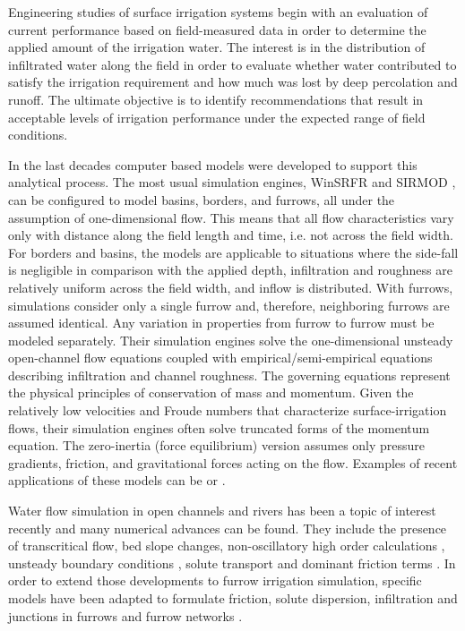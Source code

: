 \documentclass[review,authoryear]{elsarticle}
\begin{document}
Engineering studies of surface irrigation systems begin with an evaluation of
current performance based on field-measured data in order to determine the
applied amount of the irrigation water. The interest is in the distribution of
infiltrated water along the field in order to evaluate whether water contributed
to satisfy the irrigation requirement and how much was lost by deep percolation
and runoff. The ultimate objective is to identify recommendations that result in
acceptable levels of irrigation performance under the expected range of field
conditions.

In the last decades computer based models were developed to support this
analytical process. The most usual simulation engines, WinSRFR
\citep{Clemmens99} and SIRMOD \citep{Walker03}, can be configured to model
basins, borders, and furrows, all under the assumption of one-dimensional flow.
This means that all flow characteristics vary only with distance along the field
length and time, i.e. not across the field width. For borders and basins, the
models are applicable to situations where the side-fall is negligible in
comparison with the applied depth, infiltration and roughness are relatively
uniform across the field width, and inflow is distributed. With furrows,
simulations consider only a single furrow and, therefore, neighboring furrows
are assumed identical. Any variation in properties from furrow to furrow must be
modeled separately. Their simulation engines solve the one-dimensional unsteady
open-channel flow equations coupled with empirical/semi-empirical equations
describing infiltration and channel roughness. The governing equations represent
the physical principles of conservation of mass and momentum. Given the
relatively low velocities and Froude numbers that characterize
surface-irrigation flows, their simulation engines often solve truncated forms
of the momentum equation. The zero-inertia (force equilibrium) version assumes
only pressure gradients, friction, and gravitational forces acting on the flow. 
Examples of recent applications of these models can be
\cite{Bautista09a,Bautista09b} or \cite{EbrahimiamLiaghat11}.

Water flow simulation in open channels and rivers has been a topic of interest
recently and many numerical advances can be found. They include the presence of
transcritical flow, bed slope changes, non-oscillatory high order calculations
\citep{JaviTVD}, unsteady boundary conditions \citep{JaviContorno}, solute
transport \citep{JaviTrans} and dominant friction terms
\citep{JaviFriccion,JaviFriccion2}. In order to extend those developments to
furrow irrigation simulation, specific models have been adapted to formulate
friction, solute dispersion, infiltration and junctions in furrows and furrow
networks \citep{JaviSurcos1,JaviSurcos2}.
\end{document}
